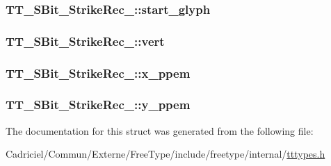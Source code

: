 \hypertarget{struct_t_t___s_bit___strike_rec___a05032d4092eef7e7214bb82d4113d8b9}{
\subsubsection[{start\-\_\-glyph}]{ T\-T\-\_\-\-S\-Bit\-\_\-\-Strike\-Rec\-\_\-\-::start\-\_\-glyph}}\label{struct_t_t___s_bit___strike_rec___a05032d4092eef7e7214bb82d4113d8b9}
\hypertarget{struct_t_t___s_bit___strike_rec___a5366f6968d1126891f2a6f27345abd5c}{
\subsubsection[{vert}]{ T\-T\-\_\-\-S\-Bit\-\_\-\-Strike\-Rec\-\_\-\-::vert}}\label{struct_t_t___s_bit___strike_rec___a5366f6968d1126891f2a6f27345abd5c}
\hypertarget{struct_t_t___s_bit___strike_rec___a2a1b17c24df2084fe485aefe8f34e7d4}{
\subsubsection[{x\-\_\-ppem}]{ T\-T\-\_\-\-S\-Bit\-\_\-\-Strike\-Rec\-\_\-\-::x\-\_\-ppem}}\label{struct_t_t___s_bit___strike_rec___a2a1b17c24df2084fe485aefe8f34e7d4}
\hypertarget{struct_t_t___s_bit___strike_rec___ad618814b841b86e7763f1aa371e04fed}{
\subsubsection[{y\-\_\-ppem}]{ T\-T\-\_\-\-S\-Bit\-\_\-\-Strike\-Rec\-\_\-\-::y\-\_\-ppem}}\label{struct_t_t___s_bit___strike_rec___ad618814b841b86e7763f1aa371e04fed}


The documentation for this struct was generated from the following file\-:\begin{DoxyCompactItemize}
\item 
Cadriciel/\-Commun/\-Externe/\-Free\-Type/include/freetype/internal/\hyperlink{tttypes_8h}{tttypes.\-h}\end{DoxyCompactItemize}
